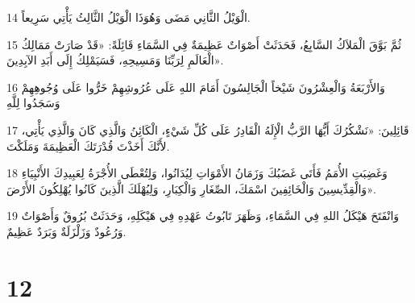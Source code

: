 \par 14 الْوَيْلُ الثَّانِي مَضَى وَهُوَذَا الْوَيْلُ الثَّالِثُ يَأْتِي سَرِيعاً.
\par 15 ثُمَّ بَوَّقَ الْمَلاَكُ السَّابِعُ، فَحَدَثَتْ أَصْوَاتٌ عَظِيمَةٌ فِي السَّمَاءِ قَائِلَةً: «قَدْ صَارَتْ مَمَالِكُ الْعَالَمِ لِرَبِّنَا وَمَسِيحِهِ، فَسَيَمْلِكُ إِلَى أَبَدِ الآبِدِينَ».
\par 16 وَالأَرْبَعَةُ وَالْعِشْرُونَ شَيْخاً الْجَالِسُونَ أَمَامَ اللهِ عَلَى عُرُوشِهِمْ خَرُّوا عَلَى وُجُوهِهِمْ وَسَجَدُوا لِلَّهِ
\par 17 قَائِلِينَ: «نَشْكُرُكَ أَيُّهَا الرَّبُّ الْإِلَهُ الْقَادِرُ عَلَى كُلِّ شَيْءٍ، الْكَائِنُ وَالَّذِي كَانَ وَالَّذِي يَأْتِي، لأَنَّكَ أَخَذْتَ قُدْرَتَكَ الْعَظِيمَةَ وَمَلَكْتَ.
\par 18 وَغَضِبَتِ الأُمَمُ فَأَتَى غَضَبُكَ وَزَمَانُ الأَمْوَاتِ لِيُدَانُوا، وَلِتُعْطَى الأُجْرَةُ لِعَبِيدِكَ الأَنْبِيَاءِ وَالْقِدِّيسِينَ وَالْخَائِفِينَ اسْمَكَ، الصِّغَارِ وَالْكِبَارِ، وَلِيُهْلَكَ الَّذِينَ كَانُوا يُهْلِكُونَ الأَرْضَ».
\par 19 وَانْفَتَحَ هَيْكَلُ اللهِ فِي السَّمَاءِ، وَظَهَرَ تَابُوتُ عَهْدِهِ فِي هَيْكَلِهِ، وَحَدَثَتْ بُرُوقٌ وَأَصْوَاتٌ وَرُعُودٌ وَزَلْزَلَةٌ وَبَرَدٌ عَظِيمٌ.

\chapter{12}

